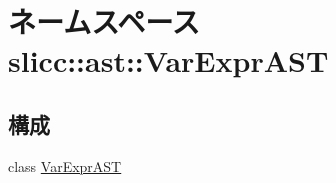 \hypertarget{namespaceslicc_1_1ast_1_1VarExprAST}{
\section{ネームスペース slicc::ast::VarExprAST}
\label{namespaceslicc_1_1ast_1_1VarExprAST}
}
\subsection*{構成}
\begin{DoxyCompactItemize}
\item 
class \hyperlink{classslicc_1_1ast_1_1VarExprAST_1_1VarExprAST}{VarExprAST}
\end{DoxyCompactItemize}
